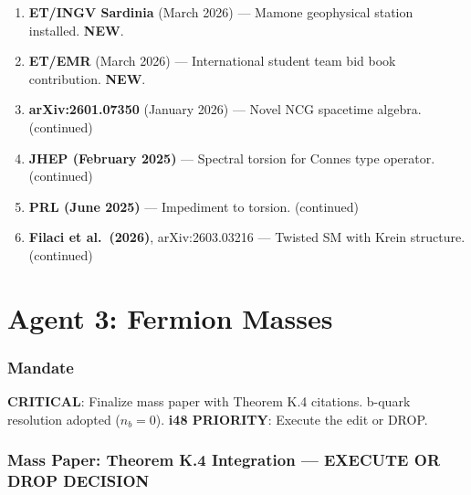 \documentclass[11pt,a4paper]{article}
\newcommand{\NEW}{\textcolor{dfdblue}{\textbf{NEW}}}
\begin{document}
\begin{enumerate}
\item \textbf{ET/INGV Sardinia} (March 2026) --- Mamone geophysical station installed. \NEW.
\item \textbf{ET/EMR} (March 2026) --- International student team bid book contribution. \NEW.
\item \textbf{arXiv:2601.07350} (January 2026) --- Novel NCG spacetime algebra. (continued)
\item \textbf{JHEP (February 2025)} --- Spectral torsion for Connes type operator. (continued)
\item \textbf{PRL (June 2025)} --- Impediment to torsion. (continued)
\item \textbf{Filaci et al.\ (2026)}, arXiv:2603.03216 --- Twisted SM with Krein structure. (continued)
\end{enumerate}


\part{Agent 3: Fermion Masses}
\label{part:agent3}

\section{Mandate}

\textbf{CRITICAL}: Finalize mass paper with Theorem K.4 citations. b-quark resolution adopted ($n_b = 0$). \textbf{i48 PRIORITY}: Execute the edit or DROP.

\section{Mass Paper: Theorem K.4 Integration --- EXECUTE OR DROP DECISION}
\end{document}
